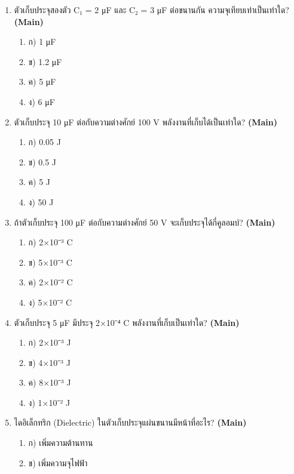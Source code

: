 \documentclass[12pt]{article}
\begin{document}
\begin{enumerate}[label=\arabic*.]
\begin{enumerate}[label=)]
\item ก) 1 μF
\item ข) 1.2 μF
\item ค) 5 μF
\item ง) 6 μF
\end{enumerate}
\item ตัวเก็บประจุสองตัว C₁ = 2 μF และ C₂ = 3 μF ต่อขนานกัน ความจุเทียบเท่าเป็นเท่าใด? \hfill \textbf{\small (Main)}
\begin{enumerate}[label=)]
\item ก) 1 μF
\item ข) 1.2 μF
\item ค) 5 μF
\item ง) 6 μF
\end{enumerate}
\item ตัวเก็บประจุ 10 μF ต่อกับความต่างศักย์ 100 V พลังงานที่เก็บได้เป็นเท่าใด? \hfill \textbf{\small (Main)}
\begin{enumerate}[label=)]
\item ก) 0.05 J
\item ข) 0.5 J
\item ค) 5 J
\item ง) 50 J
\end{enumerate}
\item ถ้าตัวเก็บประจุ 100 μF ต่อกับความต่างศักย์ 50 V จะเก็บประจุได้กี่คูลอมบ์? \hfill \textbf{\small (Main)}
\begin{enumerate}[label=)]
\item ก) 2×10⁻³ C
\item ข) 5×10⁻³ C
\item ค) 2×10⁻² C
\item ง) 5×10⁻² C
\end{enumerate}
\item ตัวเก็บประจุ 5 μF มีประจุ 2×10⁻⁴ C พลังงานที่เก็บเป็นเท่าใด? \hfill \textbf{\small (Main)}
\begin{enumerate}[label=)]
\item ก) 2×10⁻³ J
\item ข) 4×10⁻³ J
\item ค) 8×10⁻³ J
\item ง) 1×10⁻² J
\end{enumerate}
\item ไดอิเล็กทริก (Dielectric) ในตัวเก็บประจุแผ่นขนานมีหน้าที่อะไร? \hfill \textbf{\small (Main)}
\begin{enumerate}[label=)]
\item ก) เพิ่มความต้านทาน
\item ข) เพิ่มความจุไฟฟ้า

\end{enumerate}
\end{enumerate}
\end{document}
